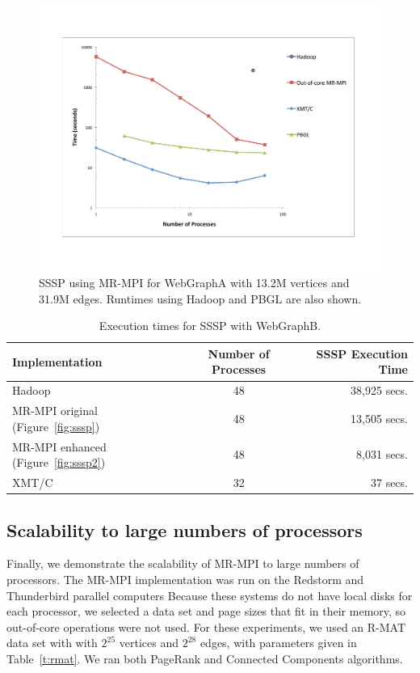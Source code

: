 \begin{figure}[h!]
\includegraphics[width=\textwidth]{fig_ssspA.pdf}
\caption{SSSP using MR-MPI for WebGraphA with
13.2M vertices and 31.9M edges.  Runtimes using Hadoop and PBGL
are also shown.}
\label{f:ssspA}
\end{figure}

\begin{table}
\begin{tabular}{|l|c|r|}
\hline
Implementation & Number of Processes & SSSP Execution Time \\
\hline
Hadoop & 48  & 38,925 secs.\\
MR-MPI original (Figure~\ref{fig:sssp}) & 48 &  13,505 secs.\\
MR-MPI enhanced (Figure~\ref{fig:sssp2}) & 48 &  8,031 secs.\\
XMT/C  & 32 &  37 secs.\\
\hline
\end{tabular}
\caption{Execution times for SSSP with {WebGraphB}.}
\label{t:ssspB}
\end{table}



\subsection{Scalability to large numbers of processors}
Finally, we demonstrate the scalability of MR-MPI to large numbers of 
processors.  
The MR-MPI implementation was run on the Redstorm and Thunderbird
parallel computers
Because these systems do not have local disks for each processor, we selected 
a data set and page sizes that fit in their memory, so out-of-core operations
were not used.  For these experiments, we used an R-MAT data set with 
with $2^{25}$ vertices and $2^{28}$ edges, with parameters given in
Table~\ref{t:rmat}.  We ran both PageRank and Connected Components
algorithms.

